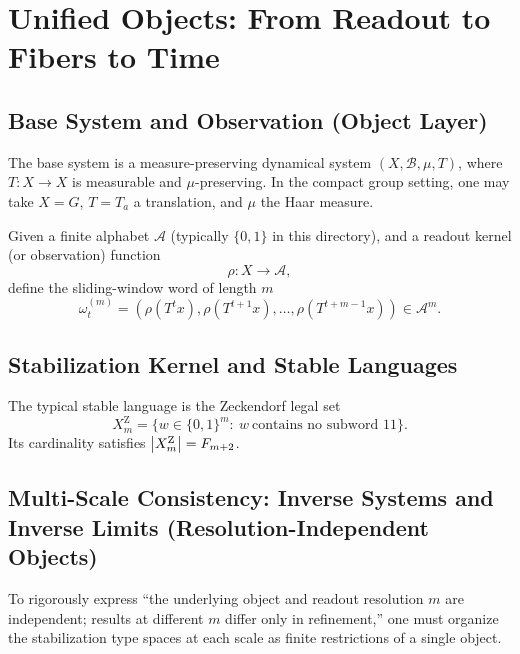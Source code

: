\section{Unified Objects: From Readout to Fibers to Time}

\subsection{Base System and Observation (Object Layer)}

\begin{definition}\label{def:base-system}
The base system is a measure-preserving dynamical system $(X,\mathcal{B},\mu,T)$, where $T:X\to X$ is measurable and $\mu$-preserving.
In the compact group setting, one may take $X=G$, $T=T_a$ a translation, and $\mu$ the Haar measure.
\end{definition}

\begin{definition}\label{def:finite-readout}
Given a finite alphabet $\mathcal{A}$ (typically $\{0,1\}$ in this directory), and a readout kernel (or observation) function
\[
\rho:X\to\mathcal{A},
\]
define the sliding-window word of length $m$
\[
\omega_t^{(m)}=(\rho(T^t x),\rho(T^{t+1}x),\dots,\rho(T^{t+m-1}x))\in\mathcal{A}^m.
\]
\end{definition}

\subsection{Stabilization Kernel and Stable Languages}

\begin{definition}\label{def:XmZ}
The typical stable language is the Zeckendorf legal set
\[
X_m^{\mathrm Z}=\{w\in\{0,1\}^m:\ w\ \text{contains no subword }11\}.
\]
Its cardinality satisfies $\left\lvert X_m^{\mathrm Z}\right\rvert=F_{m+2}$.
\end{definition}

\subsection{Multi-Scale Consistency: Inverse Systems and Inverse Limits (Resolution-Independent Objects)}

To rigorously express ``the underlying object and readout resolution $m$ are independent; results at different $m$ differ only in refinement,'' one must organize the stabilization type spaces at each scale as finite restrictions of a single object.

